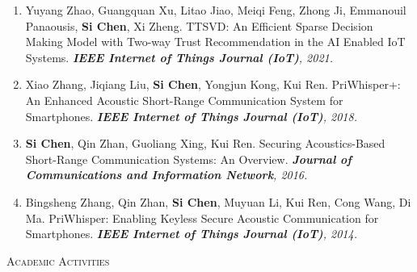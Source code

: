\documentclass[letter]{article}
\newcommand{\heading}[1]{\item \large \textsc{#1} \normalsize}
\newcommand{\publication}[4]{\item #1. #2. \emph{#3.} #4}
\begin{document}
\begin{description}
\begin{enumerate}[{J-}1.]
\publication{Yuyang Zhao, Guangquan Xu, Litao Jiao, Meiqi Feng, Zhong Ji, Emmanouil Panaousis, \textbf{Si Chen}, Xi Zheng} {TTSVD: An Efficient Sparse Decision Making Model with Two-way Trust Recommendation in the AI Enabled IoT Systems}
{\textbf{IEEE Internet of Things Journal (IoT)}, 2021}\\

\publication{Xiao Zhang, Jiqiang Liu, \textbf{Si Chen}, Yongjun Kong, Kui Ren} {PriWhisper+: An Enhanced Acoustic Short-Range Communication System for Smartphones}
{\textbf{IEEE Internet of Things Journal (IoT)}, 2018}\\

\publication{\textbf{Si Chen}, Qin Zhan, Guoliang Xing, Kui Ren} {Securing Acoustics-Based Short-Range Communication Systems: An Overview}
{\textbf{Journal of Communications and Information Network}, 2016}\\

\publication{Bingsheng Zhang, Qin Zhan, \textbf{Si Chen}, Muyuan Li, Kui Ren, Cong Wang, Di Ma} {PriWhisper: Enabling Keyless Secure Acoustic Communication for Smartphones}
{\textbf{IEEE Internet of Things Journal (IoT)}, 2014}\\

\end{enumerate}

\heading{Academic Activities}


\end{description}
\end{document}
